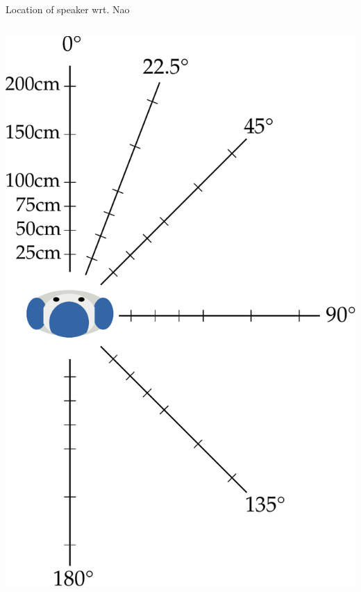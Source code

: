 \documentclass[compress]{beamer}
\begin{document}
\begin{frame}{Location of speaker wrt. Nao}
{\begin{columns}
\begin{column}{0.5\linewidth}
\begin{center}
        \includegraphics[width=0.8\linewidth]{directional_recordings}
    \end{center}
        \end{column}
    \end{columns}

}



\end{frame}
\end{document}
